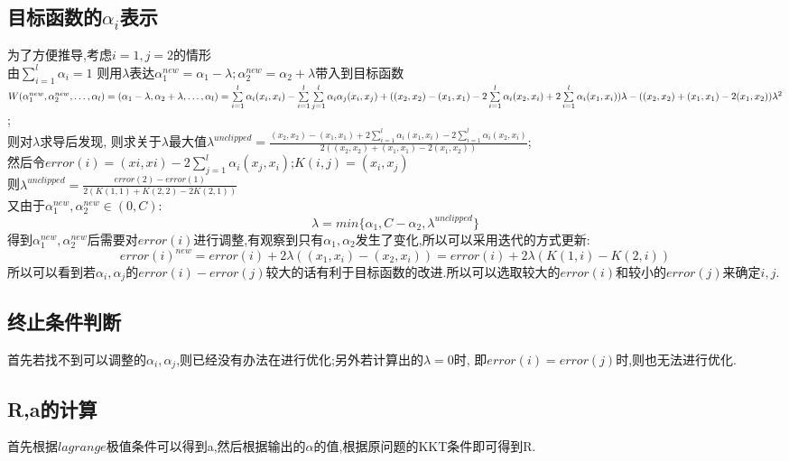 \documentclass[article,12pt]{article}
\begin{document}
\subsection{目标函数的$\alpha_i$表示}
为了方便推导,考虑$i=1,j=2$的情形\\
由$\sum\limits_{i=1}^l \alpha_i=1$
则用$\lambda$表达$\alpha_1^{new}=\alpha_1-\lambda;\alpha_2^{new}=\alpha_2+\lambda$带入到目标函数\\\tabularnewline
$W(\alpha_1^{new},\alpha_2^{new},\dots,\alpha_l)\\=(\alpha_1-\lambda,\alpha_2+\lambda,\dots,\alpha_l)\\=\sum\limits_{i=1}^l \alpha_i (x_i,x_i) -\sum\limits_{i=1}^l\sum\limits_{j=1}^l \alpha_i \alpha_j(x_i,x_j)+( (x_2,x_2)-(x_1,x_1) -2\sum\limits_{i=1}^l \alpha_i (x_2,x_i)+2\sum\limits_{i=1}^l \alpha_i (x_1,x_i))\lambda-((x_2,x_2)+(x_1,x_1)-2(x_1,x_2))\lambda^2$;\\
则对$\lambda$求导后发现,
则求关于$\lambda$最大值$\lambda^{unclipped}=\frac{(x_2,x_2)-(x_1,x_1) +2\sum\limits_{i=1}^l \alpha_i (x_1,x_i)-2\sum\limits_{i=1}^l \alpha_i (x_2,x_i)}{2((x_2,x_2)+(x_1,x_1)-2(x_1,x_2))}$;\\然后令$error(i)=(xi,xi)-2 \sum\limits_{j=1}^l \alpha_i (x_j,x_i)$;$K(i,j)=(x_i,x_j)$\\
则$\lambda^{unclipped}=\frac{error(2)-error(1)}{2(K(1,1)+K(2,2)-2K(2,1))}$\\
又由于$\alpha_1^{new},\alpha_2^{new} \in (0,C):$\\
\begin{equation}
\lambda=min\{\alpha_1,C-\alpha_2,\lambda^{unclipped}\}
\end{equation}
得到$\alpha_1^{new},\alpha_2^{new}$后需要对$error(i)$进行调整,有观察到只有$\alpha_1,\alpha_2$发生了变化,所以可以采用迭代的方式更新:
\begin{equation}
error(i)^{new}=error(i)+2\lambda((x_1,x_i)-(x_2,x_i) )=error(i)+2\lambda(K(1,i)-K(2,i) )
\end{equation}
所以可以看到若$\alpha_i,\alpha_j$的$error(i)-error(j)$较大的话有利于目标函数的改进.所以可以选取较大的$error(i)$和较小的$error(j)$来确定$i,j$.
\subsection{终止条件判断}
首先若找不到可以调整的$\alpha_i,\alpha_j$,则已经没有办法在进行优化;另外若计算出的$\lambda=0$时,
即$error(i)=error(j)$时,则也无法进行优化.
\subsection{R,a的计算}
首先根据$lagrange$极值条件可以得到a,然后根据输出的$\alpha$的值,根据原问题的KKT条件即可得到R.
\end{document}
